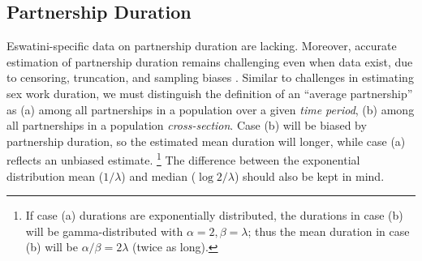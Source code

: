 \subsection{Partnership Duration}\label{mod.par.pdur}
Eswatini-specific data on partnership duration are lacking.
Moreover, accurate estimation of partnership duration remains challenging even when data exist,
due to censoring, truncation, and sampling biases \cite{Burington2010,Knight2023bias}.
Similar to challenges in estimating sex work duration,
we must distinguish the definition of an ``average partnership'' as
(a) among all partnerships in a population over a given \emph{time period}, \vs
(b) among all partnerships in a population \emph{cross-section}.
Case (b) will be biased by partnership duration,
so the estimated mean duration will longer,
while case (a) reflects an unbiased estimate.%
\footnote{If case (a) durations are exponentially distributed,
  the durations in case (b) will be gamma-distributed with $\alpha = 2, \beta = \lambda$;
  thus the mean duration in case (b) will be $\alpha/\beta = 2\lambda$ (twice as long).}
The difference between the exponential distribution
mean ($1/\lambda$) and median ($\log2/\lambda$) should also be kept in mind.
